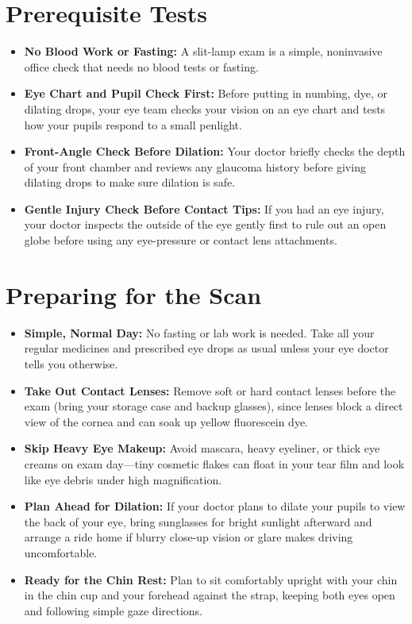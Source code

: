 \section{Prerequisite Tests}

\begin{itemize}
    \item \textbf{No Blood Work or Fasting:} A slit-lamp exam is a simple, noninvasive office check that needs no blood tests or fasting.
    \item \textbf{Eye Chart and Pupil Check First:} Before putting in numbing, dye, or dilating drops, your eye team checks your vision on an eye chart and tests how your pupils respond to a small penlight.
    \item \textbf{Front-Angle Check Before Dilation:} Your doctor briefly checks the depth of your front chamber and reviews any glaucoma history before giving dilating drops to make sure dilation is safe.
    \item \textbf{Gentle Injury Check Before Contact Tips:} If you had an eye injury, your doctor inspects the outside of the eye gently first to rule out an open globe before using any eye-pressure or contact lens attachments.
\end{itemize}

\section{Preparing for the Scan}

\begin{itemize}
    \item \textbf{Simple, Normal Day:} No fasting or lab work is needed. Take all your regular medicines and prescribed eye drops as usual unless your eye doctor tells you otherwise.
    \item \textbf{Take Out Contact Lenses:} Remove soft or hard contact lenses before the exam (bring your storage case and backup glasses), since lenses block a direct view of the cornea and can soak up yellow fluorescein dye.
    \item \textbf{Skip Heavy Eye Makeup:} Avoid mascara, heavy eyeliner, or thick eye creams on exam day---tiny cosmetic flakes can float in your tear film and look like eye debris under high magnification.
    \item \textbf{Plan Ahead for Dilation:} If your doctor plans to dilate your pupils to view the back of your eye, bring sunglasses for bright sunlight afterward and arrange a ride home if blurry close-up vision or glare makes driving uncomfortable.
    \item \textbf{Ready for the Chin Rest:} Plan to sit comfortably upright with your chin in the chin cup and your forehead against the strap, keeping both eyes open and following simple gaze directions.
\end{itemize}

